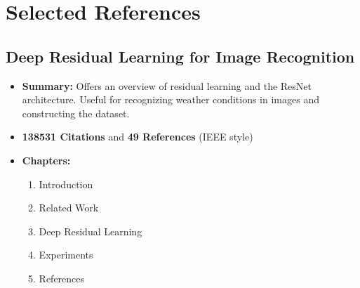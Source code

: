\documentclass[11pt]{article}
\begin{document}
    \section{Selected References}
    \subsection{Deep Residual Learning for Image Recognition \cite{DBLP:journals/corr/HeZRS15}}
    \begin{itemize}
        \item \textbf{Summary:} Offers an overview of residual learning and the ResNet architecture. Useful
            for recognizing weather conditions in images and constructing the dataset. 
        \item \textbf{138531 Citations} and \textbf{49 References} (IEEE style)
        \item \textbf{Chapters:}
            \begin{enumerate}
                \item Introduction
                \item Related Work
                \item Deep Residual Learning
                \item Experiments
                \item References
            \end{enumerate}
    \end{itemize}
\end{document}
